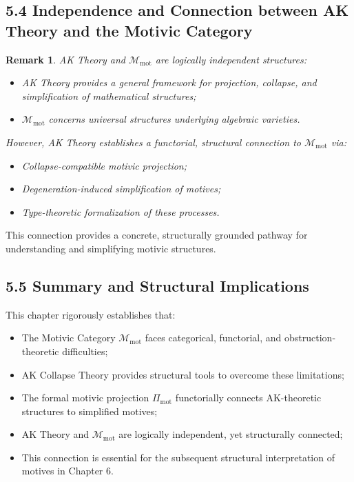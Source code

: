 \documentclass[11pt]{article}
\newtheorem{remark}[theorem]{Remark}
\begin{document}
\subsection{5.4 Independence and Connection between AK Theory and the Motivic Category}

\begin{remark}
AK Theory and $\mathcal{M}_{\mathrm{mot}}$ are logically independent structures:

\begin{itemize}
    \item AK Theory provides a general framework for projection, collapse, and simplification of mathematical structures;
    \item $\mathcal{M}_{\mathrm{mot}}$ concerns universal structures underlying algebraic varieties.
\end{itemize}

However, AK Theory establishes a functorial, structural \emph{connection} to $\mathcal{M}_{\mathrm{mot}}$ via:

\begin{itemize}
    \item Collapse-compatible motivic projection;
    \item Degeneration-induced simplification of motives;
    \item Type-theoretic formalization of these processes.
\end{itemize}
\end{remark}

This connection provides a concrete, structurally grounded pathway for understanding and simplifying motivic structures.

\subsection{5.5 Summary and Structural Implications}

This chapter rigorously establishes that:

\begin{itemize}
    \item The Motivic Category $\mathcal{M}_{\mathrm{mot}}$ faces categorical, functorial, and obstruction-theoretic difficulties;
    \item AK Collapse Theory provides structural tools to overcome these limitations;
    \item The formal motivic projection $\Pi_{\mathrm{mot}}$ functorially connects AK-theoretic structures to simplified motives;
    \item AK Theory and $\mathcal{M}_{\mathrm{mot}}$ are logically independent, yet structurally connected;
    \item This connection is essential for the subsequent structural interpretation of motives in Chapter 6.
\end{itemize}
\end{document}
